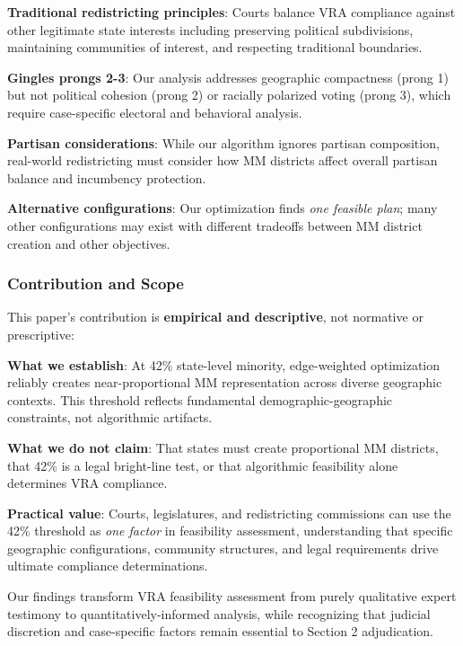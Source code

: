 \textbf{Traditional redistricting principles}: Courts balance VRA compliance against other legitimate state interests including preserving political subdivisions, maintaining communities of interest, and respecting traditional boundaries.

\textbf{Gingles prongs 2-3}: Our analysis addresses geographic compactness (prong 1) but not political cohesion (prong 2) or racially polarized voting (prong 3), which require case-specific electoral and behavioral analysis.

\textbf{Partisan considerations}: While our algorithm ignores partisan composition, real-world redistricting must consider how MM districts affect overall partisan balance and incumbency protection.

\textbf{Alternative configurations}: Our optimization finds \emph{one feasible plan}; many other configurations may exist with different tradeoffs between MM district creation and other objectives.

\subsubsection{Contribution and Scope}

This paper's contribution is \textbf{empirical and descriptive}, not normative or prescriptive:

\textbf{What we establish}: At 42\% state-level minority, edge-weighted optimization reliably creates near-proportional MM representation across diverse geographic contexts. This threshold reflects fundamental demographic-geographic constraints, not algorithmic artifacts.

\textbf{What we do not claim}: That states must create proportional MM districts, that 42\% is a legal bright-line test, or that algorithmic feasibility alone determines VRA compliance.

\textbf{Practical value}: Courts, legislatures, and redistricting commissions can use the 42\% threshold as \emph{one factor} in feasibility assessment, understanding that specific geographic configurations, community structures, and legal requirements drive ultimate compliance determinations.

Our findings transform VRA feasibility assessment from purely qualitative expert testimony to quantitatively-informed analysis, while recognizing that judicial discretion and case-specific factors remain essential to Section 2 adjudication.
